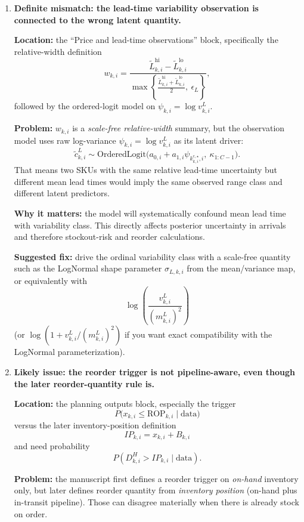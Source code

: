 \documentclass[11pt]{article}
\begin{document}
\begin{enumerate}
  \item \textbf{Definite mismatch: the lead-time variability observation is connected to the wrong latent quantity.}

  \textbf{Location:} the ``Price and lead-time observations'' block, specifically the relative-width definition
  \[
    w_{k,i}=\frac{\tilde L^{\mathrm{hi}}_{k,i}-\tilde L^{\mathrm{lo}}_{k,i}}{\max\!\left\{\frac{\tilde L^{\mathrm{hi}}_{k,i}+\tilde L^{\mathrm{lo}}_{k,i}}{2},\ \epsilon_L\right\}},
  \]
  followed by the ordered-logit model on $\psi_{k,i}=\log v^L_{k,i}$.

  \textbf{Problem:} $w_{k,i}$ is a \emph{scale-free relative-width} summary, but the observation model uses raw log-variance $\psi_{k,i}=\log v^L_{k,i}$ as its latent driver:
  \[
    \tilde c^L_{k,i}\sim\text{OrderedLogit}\!\bigl(a_{0,i}+a_{1,i}\psi_{k^{c,\star}_{k,i},i},\ \kappa_{1:C-1}\bigr).
  \]
  That means two SKUs with the same relative lead-time uncertainty but different mean lead times would imply the same observed range class and different latent predictors.

  \textbf{Why it matters:} the model will systematically confound mean lead time with variability class.
  This directly affects posterior uncertainty in arrivals and therefore stockout-risk and reorder calculations.

  \textbf{Suggested fix:} drive the ordinal variability class with a scale-free quantity such as the LogNormal shape parameter $\sigma_{L,k,i}$ from the mean/variance map, or equivalently with
  \[
    \log\!\left(\frac{v^L_{k,i}}{(m^L_{k,i})^2}\right)
  \]
  (or $\log(1+v^L_{k,i}/(m^L_{k,i})^2)$ if you want exact compatibility with the LogNormal parameterization).

  \item \textbf{Likely issue: the reorder trigger is not pipeline-aware, even though the later reorder-quantity rule is.}

  \textbf{Location:} the planning outputs block, especially the trigger
  \[
    P\bigl(x_{k,i}\le \text{ROP}_{k,i}\mid\text{data}\bigr)
  \]
  versus the later inventory-position definition
  \[
    IP_{k,i}=x_{k,i}+B_{k,i}
  \]
  and need probability
  \[
    P\!\left(D^H_{k,i}>IP_{k,i}\mid\text{data}\right).
  \]

  \textbf{Problem:} the manuscript first defines a reorder trigger on \emph{on-hand} inventory only, but later defines reorder quantity from \emph{inventory position} (on-hand plus in-transit pipeline).
  Those can disagree materially when there is already stock on order.


\end{enumerate}
\end{document}
